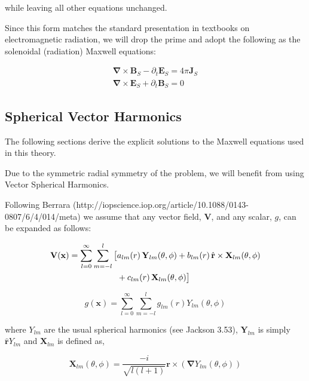 \documentclass {article}
\renewcommand\vec{\mathbf}
\let\OldS\nabla
\renewcommand{\nabla}{\boldsymbol{\OldS}}
\let\OldHat\hat
\renewcommand{\hat}[1]{\OldHat{\mathbf{#1}}}
\begin{document}
while leaving all other equations unchanged.

Since this form matches the standard presentation in textbooks on electromagnetic radiation, we will drop the prime and adopt the following as the solenoidal (radiation) Maxwell equations:

\begin{equation}
\begin{aligned}
\nabla \times \vec B_S - \partial_t \vec E_S =  4 \pi \vec J_S \\
\nabla \times \vec E_S + \partial_t \vec B_S = 0 
\end{aligned}
\end{equation}

\subsection{Spherical Vector Harmonics}

The following sections derive the explicit solutions to the Maxwell equations used in this theory.

Due to the symmetric radial symmetry of the problem, we will benefit from using Vector Spherical Harmonics. 

Following Berrara (http://iopscience.iop.org/article/10.1088/0143-0807/6/4/014/meta) we assume that any vector field, $\vec V$, and any scalar, $g$, can be expanded as follows:



\begin{align}
\vec{V}(\vec{x}) = \sum_{l=0}^{\infty} \sum_{m=-l}^{l} \big[ 
& a_{lm}(r)\, \vec{Y}_{lm}(\theta, \phi) 
+ b_{lm}(r)\, \hat{r} \times \vec{X}_{lm}(\theta, \phi) \notag \\
& + c_{lm}(r)\, \vec{X}_{lm}(\theta, \phi) 
\big]
\end{align}

\begin{equation}
g(\vec x) = \sum_{l=0}^{\infty} \sum_{m=-l}^{l} g_{lm}(r) Y_{lm}(\theta, \phi)
\end{equation}


where $Y_{lm}$ are the usual spherical harmonics (see Jackson 3.53), $\vec Y_{lm}$ is simply $\hat r Y_{lm}$  and $\vec X_{lm}$ is defined as,


\begin{equation}
\vec X_{lm}(\theta, \phi) = \frac {-i}{\sqrt{l(l+1)}} \vec r \times \left( \nabla Y_{lm}(\theta, \phi) \right) 
\label{eq:xlm}
\end{equation}
\end{document}
